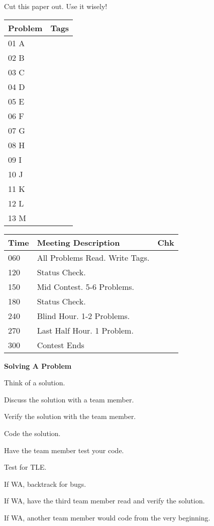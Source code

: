 Cut this paper out. Use it wisely!

\begin{tabular}{| l || m{6cm} | }
	\hline
	\textbf{Problem} & \textbf{Tags}\\	\hline
	01 A & \\	\hline
	02 B & \\	\hline
	03 C & \\	\hline
	04 D & \\	\hline
	05 E & \\	\hline
	06 F & \\	\hline
	07 G & \\	\hline
	08 H & \\	\hline
	09 I & \\	\hline
	10 J & \\	\hline
	11 K & \\	\hline
	12 L & \\	\hline
	13 M & \\	\hline
\end{tabular}
\newline\newline\newline
\begin{tabular}{| l | l || m{7mm}| }
	\hline
	\textbf{Time} & \textbf{Meeting Description} & \textbf{Chk} \\	\hline
	060 & All Problems Read. Write Tags. & 	\\	\hline
	120 & Status Check.	\\	\hline
	150 & Mid Contest. 5-6 Problems. &	\\	\hline
	180 & Status Check. &	\\	\hline
	240 & Blind Hour. 1-2 Problems. &	\\	\hline
	270 & Last Half Hour. 1 Problem. &	\\	\hline
	300 & Contest Ends &	\\	\hline
\end{tabular}
\newline\newline\newline
\textbf{\large{Solving A Problem}}
\begin{compactitem}
\item Think of a solution.
\item Discuss the solution with a team member.
\item Verify the solution with the team member.
\item Code the solution.
\item Have the team member test your code.
\item Test for TLE.
\item If WA, backtrack for bugs.
\item If WA, have the third team member read and verify the solution.
\item If WA, another team member would code from the very beginning.
\end{compactitem}
